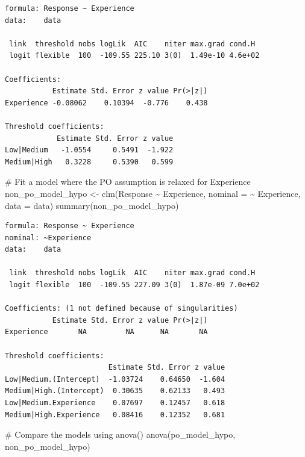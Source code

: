 \documentclass[
  letterpaper,
  DIV=11,
  numbers=noendperiod]{scrartcl}
\newenvironment{Shaded}{\begin{snugshade}}{\end{snugshade}}
\newcommand{\AttributeTok}[1]{\textcolor[rgb]{0.40,0.45,0.13}{#1}}
\newcommand{\CommentTok}[1]{\textcolor[rgb]{0.37,0.37,0.37}{#1}}
\newcommand{\FunctionTok}[1]{\textcolor[rgb]{0.28,0.35,0.67}{#1}}
\newcommand{\NormalTok}[1]{\textcolor[rgb]{0.00,0.23,0.31}{#1}}
\newcommand{\OtherTok}[1]{\textcolor[rgb]{0.00,0.23,0.31}{#1}}
\newcommand{\SpecialCharTok}[1]{\textcolor[rgb]{0.37,0.37,0.37}{#1}}
\begin{document}
\begin{verbatim}
formula: Response ~ Experience
data:    data

 link  threshold nobs logLik  AIC    niter max.grad cond.H 
 logit flexible  100  -109.55 225.10 3(0)  1.49e-10 4.6e+02

Coefficients:
           Estimate Std. Error z value Pr(>|z|)
Experience -0.08062    0.10394  -0.776    0.438

Threshold coefficients:
            Estimate Std. Error z value
Low|Medium   -1.0554     0.5491  -1.922
Medium|High   0.3228     0.5390   0.599
\end{verbatim}

\begin{Shaded}
\begin{Highlighting}[]
\CommentTok{\# Fit a model where the PO assumption is relaxed for \textquotesingle{}Experience\textquotesingle{}}
\NormalTok{non\_po\_model\_hypo }\OtherTok{\textless{}{-}} \FunctionTok{clm}\NormalTok{(Response }\SpecialCharTok{\textasciitilde{}}\NormalTok{ Experience, }\AttributeTok{nominal =} \SpecialCharTok{\textasciitilde{}}\NormalTok{ Experience, }\AttributeTok{data =}\NormalTok{ data)}
\FunctionTok{summary}\NormalTok{(non\_po\_model\_hypo) }
\end{Highlighting}
\end{Shaded}

\begin{verbatim}
formula: Response ~ Experience
nominal: ~Experience
data:    data

 link  threshold nobs logLik  AIC    niter max.grad cond.H 
 logit flexible  100  -109.55 227.09 3(0)  1.87e-09 7.0e+02

Coefficients: (1 not defined because of singularities)
           Estimate Std. Error z value Pr(>|z|)
Experience       NA         NA      NA       NA

Threshold coefficients:
                        Estimate Std. Error z value
Low|Medium.(Intercept)  -1.03724    0.64650  -1.604
Medium|High.(Intercept)  0.30635    0.62133   0.493
Low|Medium.Experience    0.07697    0.12457   0.618
Medium|High.Experience   0.08416    0.12352   0.681
\end{verbatim}

\begin{Shaded}
\begin{Highlighting}[]
\CommentTok{\# Compare the models using anova()}
\FunctionTok{anova}\NormalTok{(po\_model\_hypo, non\_po\_model\_hypo)}
\end{Highlighting}
\end{Shaded}
\end{document}
